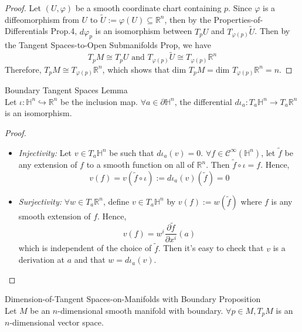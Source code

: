 \begin{proof}
    Let $(U,\varphi)$ be a smooth coordinate chart containing $p$. Since $\varphi$ is a diffeomorphism from $U$ to $\widetilde{U}:= \varphi (U) \subseteq \mathbb{R}^n$, then by the Properties-of-Differentials Prop.4, $d\varphi_p$ is an isomorphism between $T_pU$ and $T_{\varphi(p)} \widetilde{U}$. Then by the Tangent Spaces-to-Open Submanifolds Prop, we have
    \[
    T_pM \cong T_pU \text{ and } T_{\varphi(p)} \widetilde{U} \cong T_{\varphi(p)} \mathbb{R} ^n
    \]
    Therefore, $T_pM \cong T_{\varphi(p)} \mathbb{R}^n$, which shows that $\text{dim } T_pM =\text{dim }T_{\varphi(p)} \mathbb{R}^n=n$.
\end{proof}

\begin{lemma}{Boundary Tangent Spaces Lemma}\\
Let $\iota: \mathbb{H}^n \hookrightarrow \mathbb{R}^n$ be the inclusion map. $\forall a\in \partial \mathbb{H}^n$, the differential $d\iota_a :T_a\mathbb{H}^n \to T_a \mathbb{R}^n$ is an isomorphism.
\end{lemma}

\begin{proof}
    \begin{itemize}
        \item \textit{Injectivity:} Let $v\in T_a\mathbb{H}^n$ be such that $d\iota_a(v)=0$. $\forall f\in \mathcal{C}^\infty (\mathbb{H}^n)$, let $\widetilde{f}$ be any extension of $f$ to a smooth function on all of $\mathbb{R}^n$. Then $\widetilde{f} \circ \iota=f$. Hence, 
        \[
        v(f)=v(\widetilde{f} \circ \iota):= d\iota_a (v) (\widetilde{f})=0
        \]

        \item \textit{Surjectivity:} $\forall w\in T_a \mathbb{R}^n$, define $v\in T_a\mathbb{H}^n$ by $v(f):= w(\widetilde{f})$ where $f$ is any smooth extension of $f$. Hence, 
        \[
        v(f)=w^i \frac{\partial \widetilde{f}}{\partial x^i} (a)
        \]
        which is independent of the choice of $\widetilde{f}$. Then it's easy to check that $v$ is a derivation at $a$ and that $w= d\iota_a (v)$.
    \end{itemize}
\end{proof}

\begin{proposition}{Dimension-of-Tangent Spaces-on-Manifolds with Boundary Proposition}\\
Let $M$ be an $n$-dimensional smooth manifold with boundary. $\forall p\in M, T_pM$ is an $n$-dimensional vector space.
\end{proposition}

